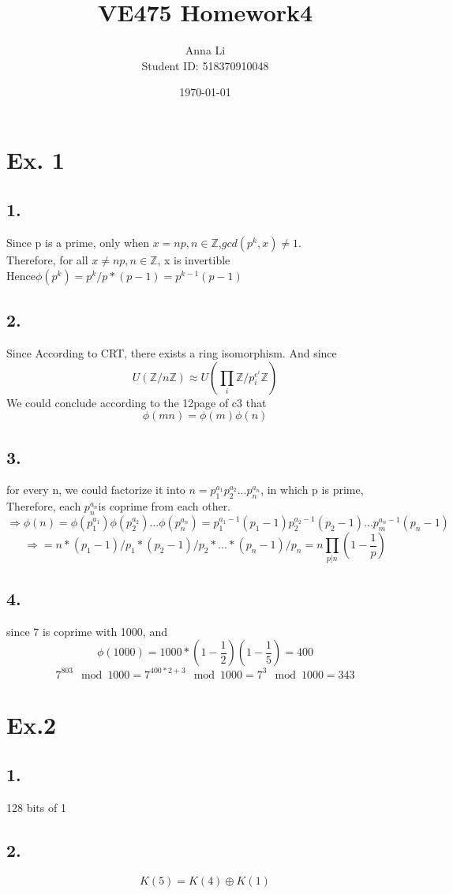 \documentclass[a4paper,12pt]{journal}
\title{VE475 Homework4}
\author{Anna Li \\Student ID: 518370910048}
\date{\today}
\begin{document}
	\maketitle
	\section*{Ex. 1}
	\subsection*{1.}
	Since p is a prime, only when $x = np, n\in\mathbb{Z}$,$gcd(p^k,x)\not=1$.\\
	Therefore, for all $x\not =np,n\in\mathbb{Z}$, x is invertible\\
	Hence$\phi(p^k)=p^{k}/p*(p-1)=p^{k-1}(p-1)$
	\subsection*{2.}
	 Since According to CRT, there exists a ring isomorphism. And since 
	 $$U(\mathbb{Z}/n\mathbb{Z})\approx U(\prod_i\mathbb{Z}/p_i^{e^i}\mathbb{Z})$$
	 We could conclude according to the 12page of c3 that $$\phi(mn)=\phi(m)\phi(n)$$
	 \subsection*{3.}
	 for every n, we could factorize it into $n=p_1^{a_1}p_2^{a_2}...p_n^{a_n}$, in which p is prime, Therefore, each $p_n^{a_n}$is coprime from each other. 
	 $$\Rightarrow \phi(n)=\phi(p_1^{a_1})\phi(p_2^{a_2})...\phi(p_n^{a_n})=p_1^{a_1-1}(p_1-1)p_2^{a_2-1}(p_2-1)...p_m^{a_n-1}(p_n-1)$$
	 $$\Rightarrow=n*(p_1-1)/p_1*(p_2-1)/p_2*...*(p_n-1)/p_n=n\prod_{p|n}(1-\frac{1}{p})$$
	 \subsection*{4.}
	 since 7 is coprime with 1000, and 
	 $$\phi(1000)=1000*(1-\frac{1}{2})(1-\frac{1}{5})=400$$
	 $$
	 		7^{803} \mod 1000 = 7^{400*2+3}\mod 1000=7^3\mod 1000=343
	 $$
	 \section*{Ex.2}
	 \subsection*{1. }
	 128 bits of 1
	 \subsection*{2. }
	 $$K(5)=K(4)\oplus K(1)$$
\end{document}
